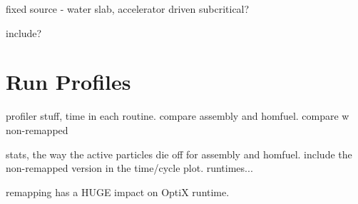 fixed source - water slab, accelerator driven subcritical?

include?



\section{Run Profiles}

profiler stuff, time in each routine.  compare assembly and homfuel.  compare w non-remapped

stats, the way the active particles die off for assembly and homfuel.  include the non-remapped version in the time/cycle plot.  runtimes...

remapping has a HUGE impact on OptiX runtime.




